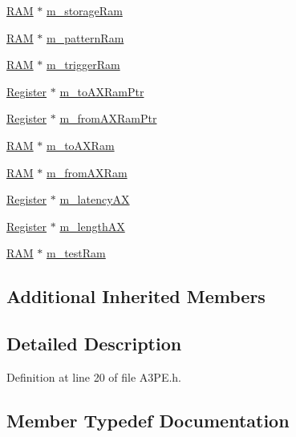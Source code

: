 \begin{DoxyCompactItemize}
\item 
\hyperlink{classRAM}{R\+AM} $\ast$ \hyperlink{classA3PE_a41e317474e0c6e63bad4648903279be9}{m\+\_\+storage\+Ram}
\item 
\hyperlink{classRAM}{R\+AM} $\ast$ \hyperlink{classA3PE_a84d5deabbbf2d513144dd6a00390182e}{m\+\_\+pattern\+Ram}
\item 
\hyperlink{classRAM}{R\+AM} $\ast$ \hyperlink{classA3PE_a2b40e3937f0aa008ec7073acc5029fcc}{m\+\_\+trigger\+Ram}
\item 
\hyperlink{classRegister}{Register} $\ast$ \hyperlink{classA3PE_aae1b8b2e96bba94535bd4de766bd7e65}{m\+\_\+to\+A\+X\+Ram\+Ptr}
\item 
\hyperlink{classRegister}{Register} $\ast$ \hyperlink{classA3PE_a27ae9467bc128e46dd80443245df096a}{m\+\_\+from\+A\+X\+Ram\+Ptr}
\item 
\hyperlink{classRAM}{R\+AM} $\ast$ \hyperlink{classA3PE_ae586a3d2fd21556e84e1af656e3430b5}{m\+\_\+to\+A\+X\+Ram}
\item 
\hyperlink{classRAM}{R\+AM} $\ast$ \hyperlink{classA3PE_a91d3dd3e87e2c948dd67cb82a63d3858}{m\+\_\+from\+A\+X\+Ram}
\item 
\hyperlink{classRegister}{Register} $\ast$ \hyperlink{classA3PE_a061472eb539bb6ac99f4fa11a760eeaf}{m\+\_\+latency\+AX}
\item 
\hyperlink{classRegister}{Register} $\ast$ \hyperlink{classA3PE_a87c93a38343873f2d52741deca4750ce}{m\+\_\+length\+AX}
\item 
\hyperlink{classRAM}{R\+AM} $\ast$ \hyperlink{classA3PE_ad788e41ef5c674ab1a7671f3db0ffef6}{m\+\_\+test\+Ram}
\end{DoxyCompactItemize}
\subsection*{Additional Inherited Members}


\subsection{Detailed Description}


Definition at line 20 of file A3\+P\+E.\+h.



\subsection{Member Typedef Documentation}
\mbox{\label{classA3PE_a2ee28b2899c3cc4f22821b4138758c28}} 
